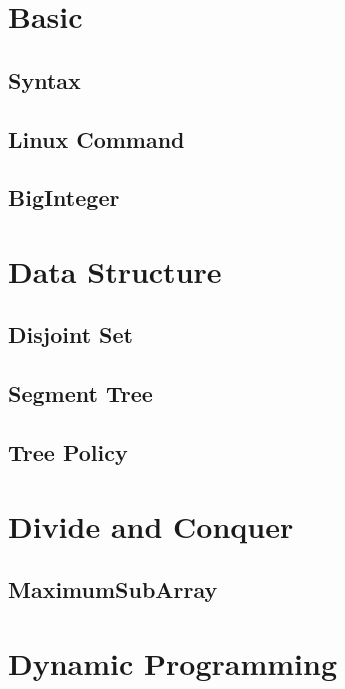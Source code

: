 \section{Basic}

\subsection{Syntax}


\subsection{Linux Command}


\subsection{BigInteger}

\section{Data Structure}

\subsection{Disjoint Set}


\subsection{Segment Tree}


\subsection{Tree Policy}

\section{Divide and Conquer}

\subsection{MaximumSubArray}

\section{Dynamic Programming}

